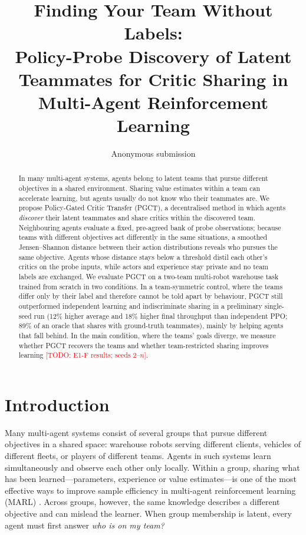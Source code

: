 \documentclass{article}
\title{Finding Your Team Without Labels:\\ Policy-Probe Discovery of Latent Teammates for Critic Sharing in Multi-Agent Reinforcement Learning}
\author{Anonymous submission}
\newcommand{\todo}[1]{\textcolor{red}{[TODO: #1]}}
\newcommand{\ours}{PGCT}
\begin{document}
\maketitle

\begin{abstract}
In many multi-agent systems, agents belong to latent teams that pursue different objectives in a shared
environment. Sharing value estimates within a team can accelerate learning, but agents usually do not know who
their teammates are. We propose Policy-Gated Critic Transfer (\ours{}), a decentralised method in which agents
\emph{discover} their latent teammates and share critics within the discovered team. Neighbouring agents evaluate a
fixed, pre-agreed bank of probe observations; because teams with different objectives act differently in the
same situations, a smoothed Jensen--Shannon distance between their action distributions reveals who pursues the
same objective. Agents whose distance stays below a threshold distil each other's critics on the probe inputs,
while actors and experience stay private and no team labels are exchanged. We evaluate \ours{} on a two-team
multi-robot warehouse task trained from scratch in two conditions. In a team-symmetric control, where the teams
differ only by their label and therefore cannot be told apart by behaviour, \ours{} still outperformed independent
learning and indiscriminate sharing in a preliminary single-seed run (12\% higher average and 18\% higher final
throughput than independent PPO; 89\% of an oracle that shares with ground-truth teammates), mainly by helping
agents that fall behind. In the main condition, where the teams' goals diverge, we measure whether \ours{} recovers
the teams and whether team-restricted sharing improves learning \todo{E1-F results; seeds 2--$n$}.
\end{abstract}

\section{Introduction}
Many multi-agent systems consist of several groups that pursue different objectives in a shared space: warehouse
robots serving different clients, vehicles of different fleets, or players of different teams. Agents in such
systems learn simultaneously and observe each other only locally. Within a group, sharing what has been
learned---parameters, experience or value estimates---is one of the most effective ways to improve sample efficiency
in multi-agent reinforcement learning (MARL) \cite{christianos2020seac,christianos2021seps}. Across groups, however,
the same knowledge describes a different objective and can mislead the learner. When group membership is latent,
every agent must first answer \emph{who is on my team?}
\end{document}
